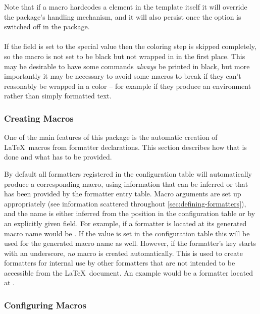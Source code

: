 \documentclass{scrartcl}
\begin{document}
Note that if a macro hardcodes a  element in the template itself
it will override the package's handling mechanism, and it will also persist once
the  option is switched off in the package.


\paragraph{}

If the  field is set to the special value  then
the coloring step is skipped completely, so the macro is not set to be black but
not wrapped in  in the first place.  This may be desirable to
have some commands \emph{always} be printed in black, but more importantly it
may be necessary to avoid some macros to break if they can't reasonably be
wrapped in a color -- for example if they produce an environment rather than
simply formatted text.


\subsubsection{Creating Macros}
\label{sec:creating-macros}

One of the main features of this package is the automatic creation of \LaTeX\
macros from formatter declarations.  This section describes how that is done and
what has to be provided.

By default all formatters registered in the configuration table will
automatically produce a corresponding macro, using information that can be
inferred or that has been provided by the formatter entry table.  Macro
arguments are set up appropriately (see information scattered throughout
\vref{sec:defining-formatters}), and the name is either inferred from the
position in the configuration table or by an explicitly given 
field.  For example, if a formatter is located at
 its generated macro name would be
\cmd{musicComposerCatalogue}.  If the \luavar{prefix} value is set in the
configuration table this will be used for the generated macro name as well.
However, if the formatter's key starts with an underscore, \emph{no} macro is
created automatically.  This is used to create formatters for internal use by
other formatters that are not intended to be accessible from the \LaTeX\
document.  An example would be a formatter located at .

\subsubsection{Configuring Macros}
\label{sec:configuring-macros}
\end{document}
